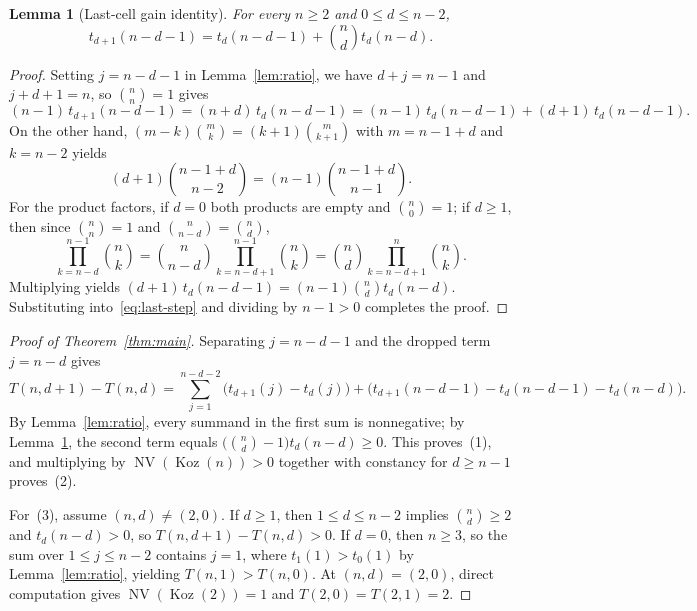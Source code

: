 \documentclass[11pt]{article}
\newtheorem{lemma}[theorem]{Lemma}
\theoremstyle{remark}
\DeclareMathOperator{\NV}{NV}
\DeclareMathOperator{\Koz}{Koz}
\begin{document}
\begin{lemma}[Last-cell gain identity]\label{lem:last}
For every $n \ge 2$ and $0 \le d \le n - 2$,
\[
  t_{d+1}(n - d - 1) = t_d(n - d - 1) + \binom{n}{d} t_d(n - d).
\]
\end{lemma}

\begin{proof}
Setting $j = n - d - 1$ in Lemma~\ref{lem:ratio}, we have $d + j = n - 1$ and $j + d + 1 = n$, so $\binom{n}{n} = 1$ gives
\begin{equation}\label{eq:last-step}
  (n - 1)\, t_{d+1}(n - d - 1) = (n + d)\, t_d(n - d - 1) = (n - 1)\, t_d(n - d - 1) + (d + 1)\, t_d(n - d - 1).
\end{equation}
On the other hand, $(m - k)\binom{m}{k} = (k + 1)\binom{m}{k + 1}$ with $m = n - 1 + d$ and $k = n - 2$ yields
\[
  (d + 1)\binom{n - 1 + d}{n - 2} = (n - 1)\binom{n - 1 + d}{n - 1}.
\]
For the product factors, if $d = 0$ both products are empty and $\binom{n}{0} = 1$; if $d \ge 1$, then since $\binom{n}{n} = 1$ and $\binom{n}{n - d} = \binom{n}{d}$,
\[
  \prod_{k=n-d}^{n-1}\binom{n}{k} = \binom{n}{n - d}\prod_{k=n-d+1}^{n-1}\binom{n}{k} = \binom{n}{d}\prod_{k=n-d+1}^{n}\binom{n}{k}.
\]
Multiplying yields $(d + 1)\, t_d(n - d - 1) = (n - 1)\binom{n}{d} t_d(n - d)$. Substituting into~\eqref{eq:last-step} and dividing by $n - 1 > 0$ completes the proof.
\end{proof}

\begin{proof}[Proof of Theorem~\ref{thm:main}]
Separating $j = n - d - 1$ and the dropped term $j = n - d$ gives
\[
  T(n, d + 1) - T(n, d) = \sum_{j=1}^{n-d-2}\bigl(t_{d+1}(j) - t_d(j)\bigr) + \bigl(t_{d+1}(n - d - 1) - t_d(n - d - 1) - t_d(n - d)\bigr).
\]
By Lemma~\ref{lem:ratio}, every summand in the first sum is nonnegative; by Lemma~\ref{lem:last}, the second term equals $\bigl(\binom{n}{d} - 1\bigr) t_d(n - d) \ge 0$. This proves~(1), and multiplying by $\NV(\Koz(n)) > 0$ together with constancy for $d \ge n - 1$ proves~(2).

For~(3), assume $(n, d) \ne (2, 0)$. If $d \ge 1$, then $1 \le d \le n - 2$ implies $\binom{n}{d} \ge 2$ and $t_d(n - d) > 0$, so $T(n, d + 1) - T(n, d) > 0$. If $d = 0$, then $n \ge 3$, so the sum over $1 \le j \le n - 2$ contains $j = 1$, where $t_1(1) > t_0(1)$ by Lemma~\ref{lem:ratio}, yielding $T(n, 1) > T(n, 0)$. At $(n, d) = (2, 0)$, direct computation gives $\NV(\Koz(2)) = 1$ and $T(2, 0) = T(2, 1) = 2$.
\end{proof}
\end{document}
